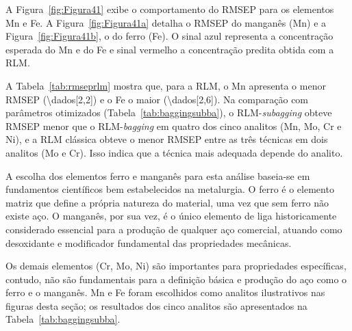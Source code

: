 A Figura~\ref{fig:Figura41} exibe o comportamento do RMSEP para os elementos Mn e Fe. A Figura~\ref{fig:Figura41a} detalha o RMSEP do manganês (Mn) e a Figura~\ref{fig:Figura41b}, o do ferro (Fe). O sinal azul representa a concentração esperada do Mn e do Fe e sinal vermelho a concentração predita obtida com a RLM. 

A Tabela~\ref{tab:rmseprlm} mostra que, para a RLM, o Mn apresenta o menor RMSEP
(\num{\dados[2,2]}) e o Fe o maior (\num{\dados[2,6]}). Na comparação com parâmetros
otimizados (Tabela~\ref{tab:baggingsubba}), o RLM-\textit{subagging} obteve RMSEP menor
que o RLM-\textit{bagging} em quatro dos cinco analitos (Mn, Mo, Cr e Ni), e a RLM
clássica obteve o menor RMSEP entre as três técnicas em dois analitos (Mo e Cr). Isso
indica que a técnica mais adequada depende do analito.



A escolha dos elementos ferro e manganês para esta análise baseia-se em fundamentos científicos bem estabelecidos na metalurgia. O ferro é o elemento matriz que define a própria natureza do material, uma vez que sem ferro não existe aço. O manganês, por sua vez, é o único elemento de liga historicamente considerado essencial para a produção de qualquer aço comercial, atuando como desoxidante e modificador fundamental das propriedades mecânicas.

Os demais elementos (Cr, Mo, Ni) são importantes para propriedades específicas, contudo, não são fundamentais para a definição básica e produção do aço como o ferro e o manganês. Mn e Fe foram escolhidos como analitos ilustrativos nas figuras desta seção; os
resultados dos cinco analitos são apresentados na Tabela~\ref{tab:baggingsubba}.



